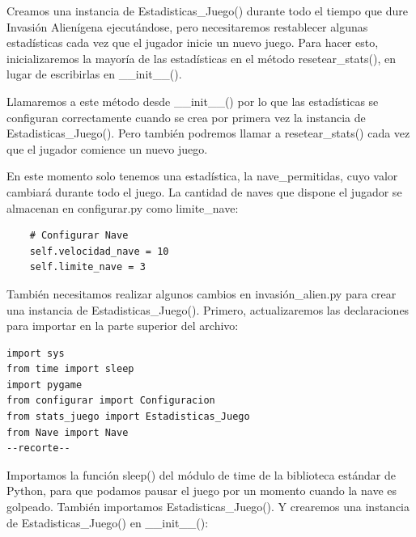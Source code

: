 Creamos una instancia de {\ttfamily Estadisticas\_Juego()} durante todo el tiempo que dure Invasión Alienígena ejecutándose, pero necesitaremos restablecer algunas estadísticas cada vez que el jugador inicie un nuevo juego.  Para hacer esto, inicializaremos 
la mayoría de las estadísticas en el  método {\ttfamily resetear\_stats()}, en lugar de escribirlas en {\ttfamily \_\_init\_\_()}. 

Llamaremos a este método desde {\ttfamily \_\_init\_\_()} por lo que las estadísticas se configuran correctamente
cuando se crea por primera vez la instancia de {\ttfamily Estadisticas\_Juego()}.
Pero también podremos llamar a  {\ttfamily resetear\_stats()} cada vez que el jugador comience un nuevo juego.

En este momento solo tenemos una estadística, la {\ttfamily nave\_permitidas}, cuyo valor cambiará
durante todo el juego.  La cantidad de naves que dispone el jugador se almacenan en {\ttfamily configurar.py}
como {\ttfamily limite\_nave}:

\hspace{-2.75cm}{\ttfamily \scriptsize configurar.py}  \vspace{-0.5cm}
\begin{lstlisting}
    # Configurar Nave
    self.velocidad_nave = 10
    self.limite_nave = 3
\end{lstlisting}

También necesitamos realizar algunos cambios en {\ttfamily invasión\_alien.py} para crear una instancia de {\ttfamily Estadisticas\_Juego()}. Primero, actualizaremos las declaraciones para importar en la parte superior del archivo:


\hspace{-2.4cm}{\ttfamily \scriptsize invasión}

\vspace{-0.2cm}
\hspace{-2.1cm}{\ttfamily \scriptsize \_alien.py}\vspace{-0.84cm}
\begin{lstlisting}
import sys
from time import sleep
import pygame
from configurar import Configuracion
from stats_juego import Estadisticas_Juego
from Nave import Nave
--recorte--
\end{lstlisting}	



Importamos la función {\ttfamily sleep()} del módulo de {\ttfamily time}  de la biblioteca estándar de Python, 
para que podamos pausar el juego por un momento cuando la nave es golpeado. También importamos {\ttfamily Estadisticas\_Juego()}. Y crearemos una instancia de {\ttfamily Estadisticas\_Juego()} en  {\ttfamily\_\_init\_\_()}:



